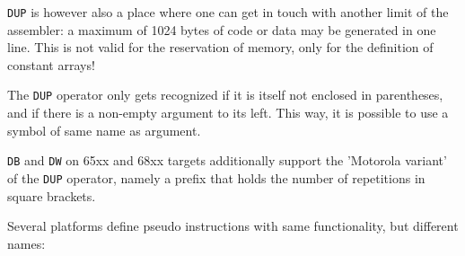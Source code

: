 \documentclass[12pt,twoside]{report}
\newcommand{\tty}[1]{{\tt #1}}
\begin{document}
\tty{DUP} is however also a place where one can get in touch with another
limit of the assembler: a maximum of 1024 bytes of code or data may be
generated in one line.  This is not valid for the reservation of memory,
only for the definition of constant arrays!

The \tty{DUP} operator only gets recognized if it is itself not enclosed
in parentheses, and if there is a non-empty argument to its left.  This
way, it is possible to use a symbol of same name as argument.

\tty{DB} and \tty{DW} on 65xx and 68xx targets additionally support
the 'Motorola variant' of the \tty{DUP} operator, namely a prefix
that holds the number of repetitions in square brackets.

Several platforms define pseudo instructions with same functionality,
but different names:
\end{document}
